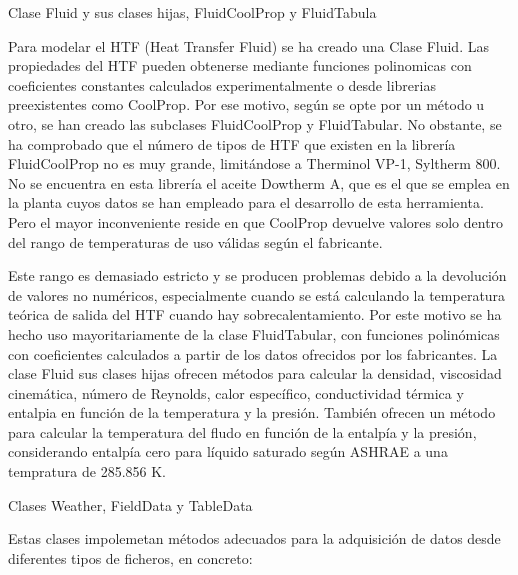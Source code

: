 \hypertarget{clase-fluid-y-sus-clases-hijas-fluidcoolprop-y-fluidtabular}{Clase Fluid y sus clases hijas, FluidCoolProp y FluidTabula}

Para modelar el HTF (Heat Transfer Fluid) se ha creado una Clase Fluid.
Las propiedades del HTF pueden obtenerse mediante funciones polinomicas con coeficientes constantes calculados experimentalmente o desde librerias preexistentes como CoolProp. Por ese motivo, según se opte por un método u otro, se han creado las subclases FluidCoolProp y FluidTabular. No obstante, se ha comprobado que el número de tipos de HTF que existen en la librería FluidCoolProp no es muy grande, limitándose a Therminol VP-1, Syltherm 800. No se encuentra en esta
librería el aceite Dowtherm A, que es el que se emplea en la planta cuyos datos se han empleado para el desarrollo de esta herramienta. Pero el mayor inconveniente reside en que CoolProp devuelve valores solo dentro del rango de temperaturas de uso válidas según el fabricante. 

Este rango es demasiado estricto y se producen problemas debido a la devolución de valores no numéricos, especialmente cuando se está calculando la temperatura teórica de salida del HTF cuando hay sobrecalentamiento. Por este motivo se ha hecho uso mayoritariamente de la clase FluidTabular, con funciones polinómicas con coeficientes calculados a partir de los datos ofrecidos por los fabricantes.  La clase Fluid sus clases hijas ofrecen métodos para calcular la densidad, viscosidad cinemática, número de Reynolds, calor específico, conductividad térmica y entalpia en función de la temperatura y la presión. También ofrecen un método para calcular la temperatura del fludo en función de la entalpía y la presión, considerando entalpía cero para líquido saturado según ASHRAE a una tempratura de 285.856 K.

\hypertarget{clases-weather-fielddata-y-tabledata}{Clases Weather, FieldData y TableData}
Estas clases impolemetan métodos adecuados para la adquisición de datos desde diferentes tipos de ficheros, en concreto:

